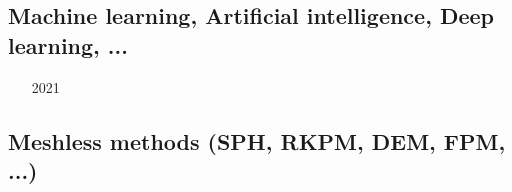 \subsection{Machine learning, Artificial intelligence, Deep learning, ...}

\begin{scriptsize}
\begin{itemize}
\item[2021] \textcite{agtk21} 
\end{itemize}
\end{scriptsize}

\subsection{Meshless methods (SPH, RKPM, DEM, FPM, ...)}

